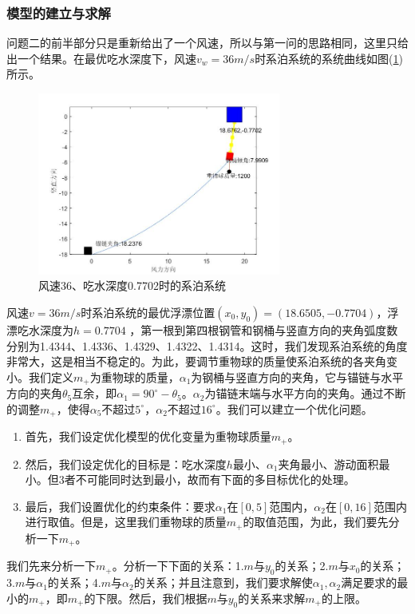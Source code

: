         \subsubsection{模型的建立与求解}
            \par
            问题二的前半部分只是重新给出了一个风速，所以与第一问的思路相同，这里只给出一个结果。在最优吃水深度下，风速$v_w=36m/s$时系泊系统的系统曲线如图(\ref{风速36、吃水深度0.7702时的系泊系统})所示。
            \begin{figure}[H]
                \centering
                \includegraphics[width=8cm]{images/v_wind_36_h_xitong.jpg}
                \caption{风速36、吃水深度0.7702时的系泊系统}
                \label{风速36、吃水深度0.7702时的系泊系统}
            \end{figure}
            \par
            风速$v=36m/s$时系泊系统的最优浮漂位置$(x_0,y_0) = (18.6505,-0.7704)$，浮漂吃水深度为$h = 0.7704$ ，第一根到第四根钢管和钢桶与竖直方向的夹角弧度数分别为1.4344、1.4336、1.4329、1.4322、1.4314。这时，我们发现系泊系统的角度非常大，这是相当不稳定的。为此，要调节重物球的质量使系泊系统的各夹角变小。我们定义$m_+$为重物球的质量，$\alpha_1$为钢桶与竖直方向的夹角，它与锚链与水平方向的夹角$\theta_5$互余，即$\alpha_1 = 90^\circ - \theta_5$。$\alpha_2$为锚链末端与水平方向的夹角。通过不断的调整$m_+$，使得$\alpha_5$不超过$5^\circ$，$\alpha_2$不超过$16^\circ$。我们可以建立一个优化问题。
            \par
            \begin{enumerate}
            \item 首先，我们设定优化模型的优化变量为重物球质量$m_+$。
            \item 然后，我们设定优化的目标是：吃水深度$h$最小、$\alpha_1$夹角最小、游动面积最小。但3者不可能同时达到最小，故而有下面的多目标优化的处理。
            \item 最后，我们设置优化的约束条件：要求$\alpha_1$在$[0,5]$范围内，$\alpha_2$在$[0,16]$范围内进行取值。但是，这里我们重物球的质量$m_+$的取值范围，为此，我们要先分析一下$m_+$。
            \end{enumerate}
            \par
            我们先来分析一下$m_+$。分析一下下面的关系：1.$m$与$y_0$的关系；2.$m$与$x_0$的关系；3.$m$与$\alpha_1$的关系；4.$m$与$\alpha_2$的关系；并且注意到，我们要求解使$\alpha_1,\alpha_2$满足要求的最小的$m_+$，即$m_+$的下限。然后，我们根据$m$与$y_0$的关系来求解$m_+$的上限。
